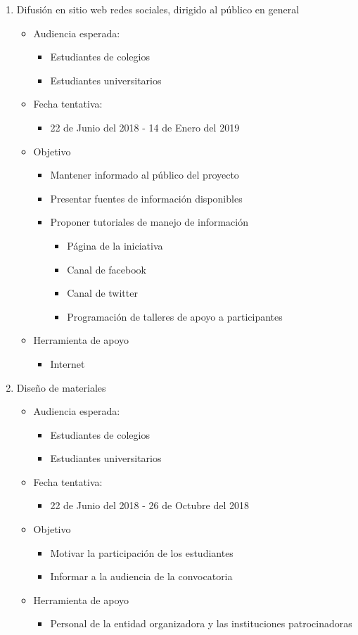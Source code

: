 \documentclass{article}
\begin{document}
\begin{enumerate}
\item Difusión en sitio web redes sociales, dirigido al público en general 
\begin{itemize}
\item Audiencia esperada:
\begin{itemize}
\item Estudiantes de colegios
\item Estudiantes universitarios
\end{itemize}
\item Fecha tentativa:
\begin{itemize}
\item 22 de Junio del 2018 - 14 de Enero del 2019
\end{itemize}
\item Objetivo
\begin{itemize}
\item Mantener informado al público del proyecto
\item Presentar fuentes de información disponibles
\item Proponer tutoriales de manejo de información
\begin{itemize}
\item Página de la iniciativa 
\item Canal de facebook
\item Canal de twitter
\item Programación de talleres de apoyo a participantes
\end{itemize}
\end{itemize}
\item Herramienta de apoyo
\begin{itemize}
\item Internet
\end{itemize}
\end{itemize}

\item Diseño de materiales
\begin{itemize}
\item Audiencia esperada:
\begin{itemize}
\item Estudiantes de colegios
\item Estudiantes universitarios
\end{itemize}
\item Fecha tentativa:
\begin{itemize}
\item 22 de Junio del 2018 - 26 de Octubre del 2018
\end{itemize}
\item Objetivo
\begin{itemize}
\item Motivar la participación de los estudiantes
\item Informar a la audiencia de la convocatoria
\end{itemize}
\item Herramienta de apoyo
\begin{itemize}
\item Personal de la entidad organizadora y las instituciones patrocinadoras
\end{itemize}
\end{itemize}


\end{enumerate}
\end{document}
